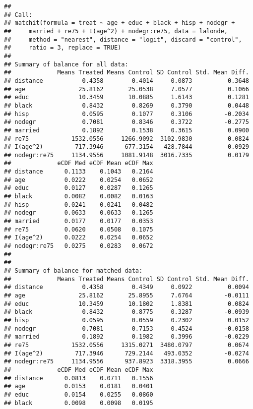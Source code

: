\documentclass[]{article}
\begin{document}
\begin{verbatim}
## 
## Call:
## matchit(formula = treat ~ age + educ + black + hisp + nodegr + 
##     married + re75 + I(age^2) + nodegr:re75, data = lalonde, 
##     method = "nearest", distance = "logit", discard = "control", 
##     ratio = 3, replace = TRUE)
## 
## Summary of balance for all data:
##             Means Treated Means Control SD Control Std. Mean Diff.
## distance           0.4358        0.4014     0.0873          0.3648
## age               25.8162       25.0538     7.0577          0.1066
## educ              10.3459       10.0885     1.6143          0.1281
## black              0.8432        0.8269     0.3790          0.0448
## hisp               0.0595        0.1077     0.3106         -0.2034
## nodegr             0.7081        0.8346     0.3722         -0.2775
## married            0.1892        0.1538     0.3615          0.0900
## re75            1532.0556     1266.9092  3102.9830          0.0824
## I(age^2)         717.3946      677.3154   428.7844          0.0929
## nodegr:re75     1134.9556     1081.9148  3016.7335          0.0179
##             eCDF Med eCDF Mean eCDF Max
## distance      0.1133    0.1043   0.2164
## age           0.0222    0.0254   0.0652
## educ          0.0127    0.0287   0.1265
## black         0.0082    0.0082   0.0163
## hisp          0.0241    0.0241   0.0482
## nodegr        0.0633    0.0633   0.1265
## married       0.0177    0.0177   0.0353
## re75          0.0620    0.0508   0.1075
## I(age^2)      0.0222    0.0254   0.0652
## nodegr:re75   0.0275    0.0283   0.0672
## 
## 
## Summary of balance for matched data:
##             Means Treated Means Control SD Control Std. Mean Diff.
## distance           0.4358        0.4349     0.0922          0.0094
## age               25.8162       25.8955     7.6764         -0.0111
## educ              10.3459       10.1802     1.8381          0.0824
## black              0.8432        0.8775     0.3287         -0.0939
## hisp               0.0595        0.0559     0.2302          0.0152
## nodegr             0.7081        0.7153     0.4524         -0.0158
## married            0.1892        0.1982     0.3996         -0.0229
## re75            1532.0556     1315.0271  3480.0797          0.0674
## I(age^2)         717.3946      729.2144   493.0352         -0.0274
## nodegr:re75     1134.9556      937.8923  3318.3955          0.0666
##             eCDF Med eCDF Mean eCDF Max
## distance      0.0813    0.0711   0.1556
## age           0.0153    0.0181   0.0401
## educ          0.0154    0.0255   0.0860
## black         0.0098    0.0098   0.0195

\end{verbatim}
\end{document}

